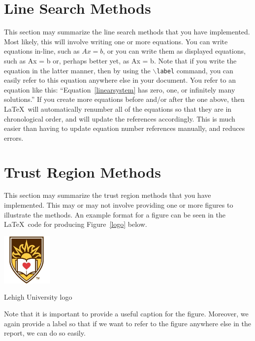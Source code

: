 \documentclass[11pt]{report}
\begin{document}
\section{Line Search Methods}

This section may summarize the line search methods that you have implemented.  Most likely, this will involve writing one or more equations.  You can write equations in-line, such as $Ax=b$, or you can write them as displayed equations, such as
\bequationn
  Ax = b
\eequationn
or, perhaps better yet, as
\bequation\label{linearsystem}
  Ax = b.
\eequation
Note that if you write the equation in the latter manner, then by using the \texttt{$\backslash$label} command, you can easily refer to this equation anywhere else in your document.  You refer to an equation like this: ``Equation~\eqref{linearsystem} has zero, one, or infinitely many solutions.''  If you create more equations before and/or after the one above, then \LaTeX\ will automatically renumber all of the equations so that they are in chronological order, and will update the references accordingly.  This is much easier than having to update equation number references manually, and reduces errors.

\section{Trust Region Methods}\label{trustregion}

This section may summarize the trust region methods that you have implemented.  This may or may not involve providing one or more figures to illustrate the methods.  An example format for a figure can be seen in the \LaTeX\ code for producing Figure~\ref{logo} below.

\bfigure[ht]
  \centering
  \includegraphics[height=1in]{../images/lehigh}
  \caption{Lehigh University logo}
  \label{logo}
\efigure

Note that it is important to provide a useful caption for the figure.  Moreover, we again provide a label so that if we want to refer to the figure anywhere else in the report, we can do so easily.

\end{document}

